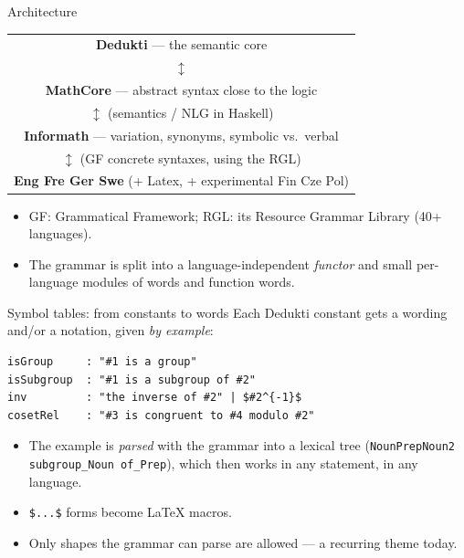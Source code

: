 \documentclass[10pt,aspectratio=169]{beamer}
\begin{document}
\begin{frame}{Architecture}
  \begin{center}
  \begin{tabular}{c}
    \textbf{Dedukti} --- the semantic core \\
    $\updownarrow$ \\
    \textbf{MathCore} --- abstract syntax close to the logic \\
    $\updownarrow$ \quad (semantics / NLG in Haskell) \\
    \textbf{Informath} --- variation, synonyms, symbolic vs.\ verbal \\
    $\updownarrow$ \quad (GF concrete syntaxes, using the RGL) \\
    \textbf{Eng \quad Fre \quad Ger \quad Swe} \quad (+ Latex, + experimental Fin Cze Pol) \\
  \end{tabular}
  \end{center}

  \vspace{0.5em}
  \begin{itemize}\small
    \item GF: Grammatical Framework; RGL: its Resource Grammar Library (40+ languages).
    \item The grammar is split into a language-independent \emph{functor}
          and small per-language modules of words and function words.
  \end{itemize}
\end{frame}

\begin{frame}[fragile]{Symbol tables: from constants to words}
  Each Dedukti constant gets a wording and/or a notation, given \emph{by example}:
\begin{lstlisting}
isGroup     : "#1 is a group"
isSubgroup  : "#1 is a subgroup of #2"
inv         : "the inverse of #2" | $#2^{-1}$
cosetRel    : "#3 is congruent to #4 modulo #2"
\end{lstlisting}
  \begin{itemize}\small
    \item The example is \emph{parsed} with the grammar into a lexical tree
          (\texttt{NounPrepNoun2 subgroup\_Noun of\_Prep}), which then
          works in any statement, in any language.
    \item \texttt{\$...\$} forms become LaTeX macros.
    \item Only shapes the grammar can parse are allowed --- a recurring theme today.
  \end{itemize}
\end{frame}
\end{document}
